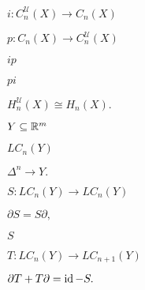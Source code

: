 \documentclass[10pt]{book}
\begin{document}
\begin{mdSnippets}
\begin{mdInlineSnippet}[7699b18c801edfa0d3c740c23c28ed6d]
$i: C_n^\mathcal{U}(X) \to C_n(X)$\end{mdInlineSnippet}%
\begin{mdInlineSnippet}[55d6bfe3d4a37b723d1598959b2c3b98]%
$p: C_n(X) \to C_n^\mathcal{U}(X)$\end{mdInlineSnippet}%
\begin{mdInlineSnippet}[957b527bcfbad2e80f58d20683931435]%
$ip$\end{mdInlineSnippet}%
\begin{mdInlineSnippet}[72ab8af56bddab33b269c5964b26620a]%
$pi$\end{mdInlineSnippet}%
\begin{mdInlineSnippet}%
$H_n^\mathcal{U}(X) \cong H_n(X).$\end{mdInlineSnippet}%
\begin{mdInlineSnippet}[33d0070d7d7098fbc8df767f0b15c96a]%
$Y \subseteq \mathbb{R}^m$\end{mdInlineSnippet}%
\begin{mdInlineSnippet}[f88d6e8fb0d43e67829847c05d29df9f]%
$LC_n(Y)$\end{mdInlineSnippet}%
\begin{mdInlineSnippet}%
$\Delta^n \to Y.$\end{mdInlineSnippet}%
\begin{mdInlineSnippet}[c9ce6ec358e7dc9b300fd6ce0b76a9a6]%
$S: LC_n(Y) \to LC_n(Y)$\end{mdInlineSnippet}%
\begin{mdInlineSnippet}[35239d52c2a3a397bded0da8c363b7e4]%
$\partial S = S \partial,$\end{mdInlineSnippet}%
\begin{mdInlineSnippet}%
$S$\end{mdInlineSnippet}%
\begin{mdInlineSnippet}[57e8d00c81a5e01fc6dc74de2ed2a018]%
$T: LC_n(Y) \to LC_{n+1}(Y)$\end{mdInlineSnippet}%
\begin{mdInlineSnippet}[e283fb9c7b72c180741abf668b835c8f]%
$\partial T + T \partial = \operatorname{id} - S.$\end{mdInlineSnippet}%

\end{mdSnippets}
\end{document}
